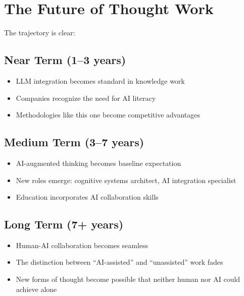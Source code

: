 \chapter{The Future of Thought Work}

The trajectory is clear:

\section{Near Term (1--3 years)}

\begin{itemize}
    \item LLM integration becomes standard in knowledge work
    \item Companies recognize the need for AI literacy
    \item Methodologies like this one become competitive advantages
\end{itemize}

\section{Medium Term (3--7 years)}

\begin{itemize}
    \item AI-augmented thinking becomes baseline expectation
    \item New roles emerge: cognitive systems architect, AI integration specialist
    \item Education incorporates AI collaboration skills
\end{itemize}

\section{Long Term (7+ years)}

\begin{itemize}
    \item Human-AI collaboration becomes seamless
    \item The distinction between ``AI-assisted'' and ``unassisted'' work fades
    \item New forms of thought become possible that neither human nor AI could achieve alone
\end{itemize}

